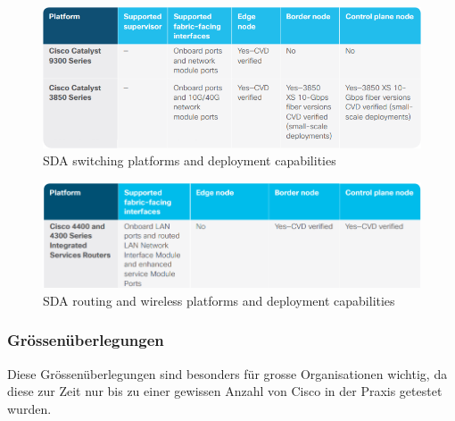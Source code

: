 \begin{figure}[H]
	\centering
	\includegraphics[width=1\linewidth]{img/Analyse/CVD-SDAswitchingplatformsanddeploymentcapabilities-1-2-5}
	\caption{SDA switching platforms and deployment capabilities \cite{sda-designguide-sept2018}}
	\label{fig:SDA switching platforms and deployment capabilities}
\end{figure}

\begin{figure}[H]
	\centering
	\includegraphics[width=1\linewidth]{img/Analyse/CVD-SDAroutingandwirelessplatformsanddeploymentcapabilities-1-2-5}
	\caption{SDA routing and wireless platforms and deployment capabilities \cite{sda-designguide-sept2018}}
	\label{fig:SDA routing and wireless platforms and deployment capabilities}
\end{figure}

\subsubsection{Grössenüberlegungen}
Diese Grössenüberlegungen sind besonders für grosse Organisationen wichtig, da diese zur Zeit nur bis zu einer gewissen Anzahl von Cisco in der Praxis getestet wurden.


